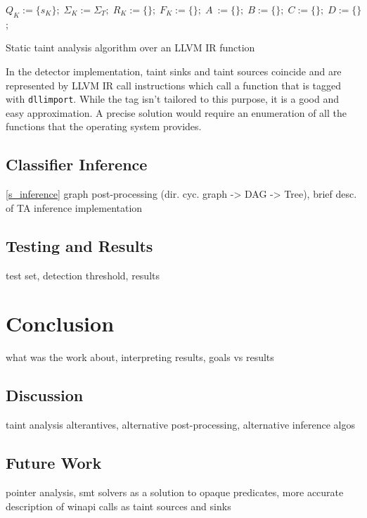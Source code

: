 \begin{algorithm}[H]
    \begin{algorithmic}
        \State{}
        \State$Q_{K} := \{s_{K}\}; \; \Sigma_{K} := \Sigma_{T}; \; R_{K} := \{\}; \; F_{K} := \{\}; \; A~:= \{\}; \; B := \{\}; \; C := \{\}; \; D := \{\}$;
    \end{algorithmic}
    \caption{Static taint analysis algorithm over an {LLVM IR} function}
    \label{alg_taint}
\end{algorithm}

In the detector implementation, taint sinks and taint sources coincide and are represented by {LLVM IR} call instructions which call a function that is tagged with \texttt{dllimport}. While the tag isn't tailored to this purpose, it is a good and easy approximation. A precise solution would require an enumeration of all the functions that the operating system provides.

\section{Classifier Inference}
\ref{s_inference}
graph post-processing (dir. cyc. graph -> DAG -> Tree), brief desc. of TA inference implementation
\section{Testing and Results}
test set, detection threshold, results
\chapter{Conclusion}
\label{ch_conclusion}
what was the work about, interpreting results, goals vs results
\section{Discussion}
taint analysis alterantives, alternative post-processing, alternative inference algos
\section{Future Work}
pointer analysis, smt solvers as a solution to opaque predicates, more accurate description of winapi calls as taint sources and sinks

